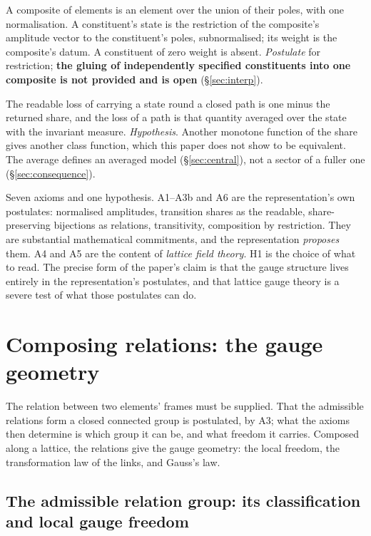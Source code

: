 \documentclass[11pt,a4paper]{article}
\theoremstyle{plain}
\theoremstyle{definition}
\theoremstyle{remark}
\begin{document}
\begin{tcolorbox}[paperbox, title=The axioms]
\begin{description}[leftmargin=1.5em,style=nextline]
\item[A6 --- composition.] A composite of elements is an element over the union of their poles, with one normalisation. A constituent's state is the restriction of the composite's amplitude vector to the constituent's poles, subnormalised; its weight is the composite's datum. A constituent of zero weight is absent. \emph{Postulate} for restriction; \textbf{the gluing of independently specified constituents into one composite is not provided and is open} (\S\ref{sec:interp}).
\item[H1 --- the loss.] The readable loss of carrying a state round a closed path is one minus the returned share, and the loss of a path is that quantity averaged over the state with the invariant measure. \emph{Hypothesis}. Another monotone function of the share gives another class function, which this paper does not show to be equivalent. The average defines an averaged model (\S\ref{sec:central}), not a sector of a fuller one (\S\ref{sec:consequence}).
\end{description}
\end{tcolorbox}

Seven axioms and one hypothesis. A1--A3b and A6 are the representation's own postulates: normalised amplitudes, transition shares as the readable, share-preserving bijections as relations, transitivity, composition by restriction. They are substantial mathematical commitments, and the representation \emph{proposes} them. A4 and A5 are the content of \emph{lattice field theory}. H1 is the choice of what to read. The precise form of the paper's claim is that the gauge structure lives entirely in the representation's postulates, and that lattice gauge theory is a severe test of what those postulates can do.

\clearpage
\section{Composing relations: the gauge geometry}\label{sec:geometry}

The relation between two elements' frames must be supplied. That the admissible relations form a closed connected group is postulated, by A3; what the axioms then determine is which group it can be, and what freedom it carries. Composed along a lattice, the relations give the gauge geometry: the local freedom, the transformation law of the links, and Gauss's law.

\subsection{The admissible relation group: its classification and local gauge freedom}
\end{document}
